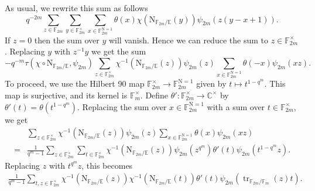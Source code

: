 \documentclass[12pt, reqno]{amsart}
\theoremstyle{definition}
\theoremstyle{definition}
\theoremstyle{definition}
\newcommand{\cComplex}{\mathbb{C}}
\newcommand{\multiplicativegroup}[1]{#1^{\times}}
\newcommand{\fieldCharacter}{\psi}
\newcommand{\trace}{\operatorname{tr}}
\newcommand{\aFieldNorm}{\mathrm{N}}
\newcommand{\finiteField}{\mathbb{F}}
\newcommand{\quadraticExtension}{\mathbb{E}}
\newcommand{\finiteFieldExtension}[1]{\finiteField_{#1}}
\newcommand{\NormOneGroup}[1]{\finiteFieldExtension{#1}^{\aFieldNorm = 1}}
\begin{document}
As usual, we rewrite this sum as follows
$$q^{-2m} \sum_{z \in \finiteFieldExtension{2m}} \sum_{y \in \multiplicativegroup{\finiteFieldExtension{2m}}} \sum_{x \in \NormOneGroup{2m}} \theta \left(x\right) \chi\left(\aFieldNorm_{\finiteFieldExtension{2m} \slash \quadraticExtension}\left(y\right)\right) \fieldCharacter_{2m}\left(z\left(y-x+1\right)\right).$$
If $z=0$ then the sum over $y$ will vanish. Hence we can reduce the sum to $z \in \multiplicativegroup{\finiteFieldExtension{2m}}$. Replacing $y$ with $z^{-1} y$ we get the sum
$$-q^{-m} \tau\left(\chi \circ \aFieldNorm_{\finiteFieldExtension{2m} \slash \quadraticExtension}, \fieldCharacter_{2m}\right) \sum_{z \in \multiplicativegroup{\finiteFieldExtension{2m}}} \chi^{-1}\left(\aFieldNorm_{\finiteFieldExtension{2m} \slash \quadraticExtension}\left(z\right)\right) \fieldCharacter_{2m}\left(z\right)  \sum_{x \in \NormOneGroup{2m}} \theta \left(-x\right) \fieldCharacter_{2m}\left(xz\right).$$
To proceed, we use the Hilbert 90 map $\multiplicativegroup{\finiteFieldExtension{2m}} \to \NormOneGroup{2m}$ given by $t \mapsto t^{1 - q^m}$. This map is surjective, and its kernel is $\multiplicativegroup{\finiteFieldExtension{m}}$. Define $\theta' \colon \multiplicativegroup{\finiteFieldExtension{2m}} \to \multiplicativegroup{\cComplex}$ by $\theta'\left(t\right) = \theta\left(t^{1-q^m}\right)$. Replacing the sum over $x \in \NormOneGroup{2m}$ with a sum over $t \in \multiplicativegroup{\finiteFieldExtension{2m}}$, we get \begin{align*}
	& \sum_{z \in \multiplicativegroup{\finiteFieldExtension{2m}}} \chi^{-1}\left(\aFieldNorm_{\finiteFieldExtension{2m} \slash \quadraticExtension}\left(z\right)\right) \fieldCharacter_{2m}\left(z\right) \sum_{x \in \NormOneGroup{2m}} \theta \left(x\right) \fieldCharacter_{2m}\left(xz\right) \\
	= & \frac{1}{q^m-1}\sum_{z \in \multiplicativegroup{\finiteFieldExtension{2m}}} \sum_{t \in \multiplicativegroup{\finiteFieldExtension{2m}}} \chi^{-1}\left(\aFieldNorm_{\finiteFieldExtension{2m} \slash \quadraticExtension}\left(z\right)\right) \fieldCharacter_{2m}\left(z^{q^m}\right) \theta' \left(t\right) \fieldCharacter_{2m}\left(t^{1-q^m} z\right).
\end{align*}
Replacing $z$ with $t^{q^m} z$, this becomes
\begin{align*}
	\frac{1}{q^m-1}\sum_{t,z \in \multiplicativegroup{\finiteFieldExtension{2m}}} \chi^{-1}\left(\aFieldNorm_{\finiteFieldExtension{2m} \slash \quadraticExtension}\left(z\right)\right) \chi^{-1}\left(\aFieldNorm_{\finiteFieldExtension{2m} \slash \quadraticExtension}\left(t\right)\right) \theta' \left(t\right) \fieldCharacter_{2m}\left(\trace_{\finiteFieldExtension{2m} \slash \finiteFieldExtension{m}}\left(z\right) t\right).
\end{align*}
\end{document}
